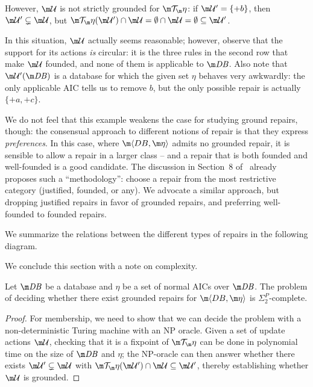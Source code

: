 {\begin{example}
  However, $\UU$ is not strictly grounded for $\Op$: if $\UU'=\{{+b}\}$, then $\UU'\subsetneq\UU$, but $\Op(\UU')\cap\UU=\emptyset\cap\UU=\emptyset\subseteq\UU'$.
\end{example}
In this situation, $\UU$ actually seems reasonable; however, observe that the support for its actions \emph{is} circular: it is the three rules in the second row that make $\UU$ founded, and none of them is applicable to $\db$.
Also note that $\UU'(\db)$ is a database for which the given set $\eta$ behaves very awkwardly: the only applicable AIC tells us to remove $b$, but the only possible repair is actually $\{{+a},{+c}\}$.

We do not feel that this example weakens the case for studying ground repairs, though: the consensual approach to different notions of repair is that they express \emph{preferences}.
In this case, where $\fulldb$ admits no grounded repair, it is sensible to allow a repair in a larger class -- and a repair that is both founded and well-founded is a good candidate.
The discussion in Section~8 of~\cite{Caroprese2011} already proposes such a ``methodology'': choose a repair from the most restrictive category (justified, founded, or any).
We advocate a similar approach, but dropping justified repairs in favor of grounded repairs, and preferring well-founded to founded repairs.

We summarize the relations between the different types of repairs in the following diagram.

We conclude this section with a note on complexity.

\begin{theorem}
  \label{thm:grounded-complexity}
  Let $\db$ be a database and $\eta$ be a set of normal AICs over $\db$.
  The problem of deciding whether there exist grounded repairs for $\fulldb$ is $\Sigma^P_2$-complete.
\end{theorem}
\begin{proof}
  For membership, we need to show that we can decide the problem with a non-deterministic Turing machine with an NP oracle.
  Given a set of update actions $\UU$, checking that it is a fixpoint of $\Op$ can be done in polynomial time on the size of $\db$ and $\eta$; the NP-oracle can then answer whether there exists $\UU'\subsetneq\UU$ with $\Op(\UU')\cap\UU\subseteq\UU'$, thereby establishing whether $\UU$ is grounded.


\end{proof}}
